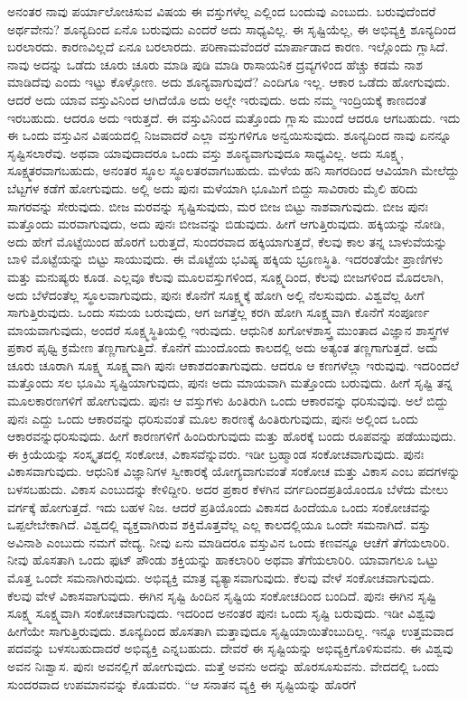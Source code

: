 ಅನಂತರ ನಾವು ಪರ್ಯಾಲೋಚಿಸುವ ವಿಷಯ ಈ ವಸ್ತುಗಳೆಲ್ಲ ಎಲ್ಲಿಂದ ಬಂದುವು ಎಂಬುದು. ಬರುವುದೆಂದರೆ ಅರ್ಥವೇನು? ಶೂನ್ಯದಿಂದ ಏನೊ ಬರುವುದು ಎಂದರೆ ಅದು ಸಾಧ್ಯವಿಲ್ಲ. ಈ ಸೃಷ್ಟಿಯೆಲ್ಲ, ಈ ಅಭಿವ್ಯಕ್ತಿ ಶೂನ್ಯದಿಂದ ಬರಲಾರದು. ಕಾರಣವಿಲ್ಲದೆ ಏನೂ ಬರಲಾರದು. ಪರಿಣಾಮವೆಂದರೆ ಮಾರ್ಪಾಡಾದ ಕಾರಣ. ಇಲ್ಲೊಂದು ಗ್ಲಾಸಿದೆ. ನಾವು ಅದನ್ನು ಒಡೆದು ಚೂರು ಚೂರು ಮಾಡಿ ಪುಡಿ ಮಾಡಿ ರಾಸಾಯನಿಕ ದ್ರವ್ಯಗಳಿಂದ ಹೆಚ್ಚು ಕಡಮೆ ನಾಶ ಮಾಡಿದೆವು ಎಂದು ಇಟ್ಟು ಕೊಳ್ಳೋಣ. ಅದು ಶೂನ್ಯವಾಗುವುದೆ? ಎಂದಿಗೂ ಇಲ್ಲ. ಆಕಾರ ಒಡೆದು ಹೋಗುವುದು. ಆದರೆ ಅದು ಯಾವ ವಸ್ತುವಿನಿಂದ ಆಗಿದೆಯೊ ಅದು ಅಲ್ಲೇ ಇರುವುದು. ಅದು ನಮ್ಮ ಇಂದ್ರಿಯಕ್ಕೆ ಕಾಣದಂತೆ ಇರಬಹುದು. ಆದರೂ ಅದು ಇರುತ್ತದೆ. ಈ ವಸ್ತುವಿನಿಂದ ಮತ್ತೊಂದು ಗ್ಲಾಸು ಮುಂದೆ ಆದರೂ ಆಗಬಹುದು. ಇದು ಈ ಒಂದು ವಸ್ತುವಿನ ವಿಷಯದಲ್ಲಿ ನಿಜವಾದರೆ ಎಲ್ಲಾ ವಸ್ತುಗಳಿಗೂ ಅನ್ವಯಿಸುವುದು. ಶೂನ್ಯದಿಂದ ನಾವು ಏನನ್ನೂ ಸೃಷ್ಟಿಸಲಾರೆವು. ಅಥವಾ ಯಾವುದಾದರೂ ಒಂದು ವಸ್ತು ಶೂನ್ಯವಾಗುವುದೂ ಸಾಧ್ಯವಿಲ್ಲ. ಅದು ಸೂಕ್ಷ್ಮ, ಸೂಕ್ಷ್ಮತರವಾಗಬಹುದು, ಅನಂತರ ಸ್ಥೂಲ ಸ್ಥೂಲತರವಾಗಬಹುದು. ಮಳೆಯ ಹನಿ ಸಾಗರದಿಂದ ಆವಿಯಾಗಿ ಮೇಲೆದ್ದು ಬೆಟ್ಟಗಳ ಕಡೆಗೆ ಹೋಗುವುದು. ಅಲ್ಲಿ ಅದು ಪುನಃ ಮಳೆಯಾಗಿ ಭೂಮಿಗೆ ಬಿದ್ದು ಸಾವಿರಾರು ಮೈಲಿ ಹರಿದು ಸಾಗರವನ್ನು ಸೇರುವುದು. ಬೀಜ ಮರವನ್ನು ಸೃಷ್ಟಿಸುವುದು, ಮರ ಬೀಜ ಬಿಟ್ಟು ನಾಶವಾಗುವುದು. ಬೀಜ ಪುನಃ ಮತ್ತೊಂದು ಮರವಾಗುವುದು, ಅದು ಪುನಃ ಬೀಜವನ್ನು ಬಿಡುವುದು. ಹೀಗೆ ಆಗುತ್ತಿರುವುದು. ಹಕ್ಕಿಯನ್ನು ನೋಡಿ, ಅದು ಹೇಗೆ ಮೊಟ್ಟೆಯಿಂದ ಹೊರಗೆ ಬರುತ್ತದೆ, ಸುಂದರವಾದ ಹಕ್ಕಿಯಾಗುತ್ತದೆ, ಕೆಲವು ಕಾಲ ತನ್ನ ಬಾಳುವೆಯನ್ನು ಬಾಳಿ ಮೊಟ್ಟೆಯನ್ನು ಬಿಟ್ಟು ಸಾಯುವುದು. ಈ ಮೊಟ್ಟೆಯ ಭವಿಷ್ಯ ಹಕ್ಕಿಯ ಭ್ರೂಣಸ್ಥಿತಿ. ಇದರಂತೆಯೇ ಪ್ರಾಣಿಗಳು ಮತ್ತು ಮನುಷ್ಯರು ಕೂಡ. ಎಲ್ಲವೂ ಕೆಲವು ಮೂಲವಸ್ತುಗಳಿಂದ, ಸೂಕ್ಷ್ಮದಿಂದ, ಕೆಲವು ಬೀಜಗಳಿಂದ ಮೊದಲಾಗಿ, ಅದು ಬೆಳೆದಂತೆಲ್ಲ ಸ್ಥೂಲವಾಗುವುದು, ಪುನಃ ಕೊನೆಗೆ ಸೂಕ್ಷ್ಮಕ್ಕೆ ಹೋಗಿ ಅಲ್ಲಿ ನೆಲಸುವುದು. ವಿಶ್ವವೆಲ್ಲ ಹೀಗೆ ಸಾಗುತ್ತಿರುವುದು. ಒಂದು ಸಮಯ ಬರುವುದು, ಆಗ ಜಗತ್ತೆಲ್ಲ ಕರಗಿ ಹೋಗಿ ಸೂಕ್ಷ್ಮವಾಗಿ ಕೊನೆಗೆ ಸಂಪೂರ್ಣ ಮಾಯವಾಗುವುದು, ಅಂದರೆ ಸೂಕ್ಷ್ಮಸ್ಥಿತಿಯಲ್ಲಿ ಇರುವುದು. ಆಧುನಿಕ ಖಗೋಳಶಾಸ್ತ್ರ ಮುಂತಾದ ವಿಜ್ಞಾನ ಶಾಸ್ತ್ರಗಳ ಪ್ರಕಾರ ಪೃಥ್ವಿ ಕ್ರಮೇಣ ತಣ್ಣಗಾಗುತ್ತಿದೆ. ಕೊನೆಗೆ ಮುಂದೊಂದು ಕಾಲದಲ್ಲಿ ಅದು ಅತ್ಯಂತ ತಣ್ಣಗಾಗುತ್ತದೆ. ಅದು ಚೂರು ಚೂರಾಗಿ ಸೂಕ್ಷ್ಮ ಸೂಕ್ಷ್ಮವಾಗಿ ಪುನಃ ಆಕಾಶದಂತಾಗುವುದು. ಆದರೂ ಆ ಕಣಗಳೆಲ್ಲಾ ಇರುವುವು. ಇದರಿಂದಲೆ ಮತ್ತೊಂದು ಸಲ ಭೂಮಿ ಸೃಷ್ಟಿಯಾಗುವುದು, ಪುನಃ ಅದು ಮಾಯವಾಗಿ ಮತ್ತೊಂದು ಬರುವುದು. ಹೀಗೆ ಸೃಷ್ಟಿ ತನ್ನ ಮೂಲಕಾರಣಗಳಿಗೆ ಹೋಗುವುದು. ಪುನಃ ಆ ವಸ್ತುಗಳು ಹಿಂತಿರುಗಿ ಒಂದು ಆಕಾರವನ್ನು ಧರಿಸುವುವು. ಅಲೆ ಬಿದ್ದು ಪುನಃ ಎದ್ದು ಒಂದು ಆಕಾರವನ್ನು ಧರಿಸುವಂತೆ ಮೂಲ ಕಾರಣಕ್ಕೆ ಹಿಂತಿರುಗುವುದು, ಪುನಃ ಅಲ್ಲಿಂದ ಒಂದು ಆಕಾರವನ್ನು\break ಧರಿಸುವುದು. ಹೀಗೆ ಕಾರಣಗಳಿಗೆ ಹಿಂದಿರುಗುವುದು ಮತ್ತು ಹೊರಕ್ಕೆ ಬಂದು ರೂಪವನ್ನು ಪಡೆಯುವುದು. ಈ ಕ್ರಿಯೆಯನ್ನು ಸಂಸ್ಕೃತದಲ್ಲಿ ಸಂಕೋಚ, ವಿಕಾಸವೆನ್ನುವರು. ಇಡೀ ಬ್ರಹ್ಮಾಂಡ ಸಂಕೋಚವಾಗುವುದು. ಪುನಃ ವಿಕಾಸವಾಗುವುದು. ಆಧುನಿಕ ವಿಜ್ಞಾನಿಗಳ ಸ್ವೀಕಾರಕ್ಕೆ ಯೋಗ್ಯವಾಗುವಂತೆ ಸಂಕೋಚ ಮತ್ತು ವಿಕಾಸ ಎಂಬ ಪದಗಳನ್ನು ಬಳಸಬಹುದು. ವಿಕಾಸ ಎಂಬುದನ್ನು ಕೇಳಿದ್ದೀರಿ. ಅದರ ಪ್ರಕಾರ ಕೆಳಗಿನ ವರ್ಗದಿಂದ\break ಪ್ರತಿಯೊಂದೂ ಬೆಳೆದು ಮೇಲು ವರ್ಗಕ್ಕೆ ಹೋಗುತ್ತದೆ. ಇದು ಬಹಳ ನಿಜ. ಆದರೆ ಪ್ರತಿಯೊಂದು ವಿಕಾಸದ ಹಿಂದೆಯೂ ಒಂದು ಸಂಕೋಚವನ್ನು ಒಪ್ಪಲೇಬೇಕಾಗಿದೆ. ವಿಶ್ವದಲ್ಲಿ ವ್ಯಕ್ತವಾಗಿರುವ ಶಕ್ತಿಮೊತ್ತವೆಲ್ಲ ಎಲ್ಲ ಕಾಲದಲ್ಲಿಯೂ ಒಂದೇ ಸಮನಾಗಿದೆ. ವಸ್ತು ಅವಿನಾಶಿ ಎಂಬುದು ನಮಗೆ ವೇದ್ಯ. ನೀವು ಏನು ಮಾಡಿದರೂ ವಸ್ತುವಿನ ಒಂದು ಕಣವನ್ನೂ ಆಚೆಗೆ ತೆಗೆಯಲಾರಿರಿ. ನೀವು ಹೊಸತಾಗಿ ಒಂದು ಫುಟ್ ಪೌಂಡು ಶಕ್ತಿಯನ್ನು ಹಾಕಲಾರಿರಿ ಅಥವಾ ತೆಗೆಯಲಾರಿರಿ. ಯಾವಾಗಲೂ ಒಟ್ಟು ಮೊತ್ತ ಒಂದೇ ಸಮನಾಗಿರುವುದು. ಅಭಿವ್ಯಕ್ತಿ ಮಾತ್ರ ವ್ಯತ್ಯಾಸವಾಗುವುದು. ಕೆಲವು ವೇಳೆ ಸಂಕೋಚವಾಗುವುದು. ಕೆಲವು ವೇಳೆ ವಿಕಾಸವಾಗುವುದು. ಈಗಿನ ಸೃಷ್ಟಿ ಹಿಂದಿನ ಸೃಷ್ಟಿಯ ಸಂಕೋಚದಿಂದ ಬಂದಿದೆ. ಪುನಃ ಈಗಿನ ಸೃಷ್ಟಿ ಸೂಕ್ಷ್ಮ ಸೂಕ್ಷ್ಮವಾಗಿ ಸಂಕೋಚವಾಗುವುದು. ಇದರಿಂದ ಅನಂತರ ಪುನಃ ಒಂದು ಸೃಷ್ಟಿ ಬರುವುದು. ಇಡೀ ವಿಶ್ವವು ಹೀಗೆಯೇ ಸಾಗುತ್ತಿರುವುದು. ಶೂನ್ಯದಿಂದ ಹೊಸತಾಗಿ ಮತ್ತಾವುದೂ ಸೃಷ್ಟಿಯಾಯಿತೆಂಬುದಿಲ್ಲ. ಇನ್ನೂ ಉತ್ತಮವಾದ ಪದವನ್ನು ಬಳಸಬಹುದಾದರೆ ಅಭಿವ್ಯಕ್ತಿ ಎನ್ನಬಹುದು. ದೇವರೆ ಈ ಸೃಷ್ಟಿಯನ್ನು ಅಭಿವ್ಯಕ್ತಿಗೊಳಿಸುವನು. ಈ ವಿಶ್ವವು ಅವನ ನಿಃಶ್ವಾಸ. ಪುನಃ ಅವನಲ್ಲಿಗೆ ಹೋಗುವುದು. ಮತ್ತೆ ಅವನು ಅದನ್ನು ಹೊರಸೂಸುವನು. ವೇದದಲ್ಲಿ ಒಂದು ಸುಂದರವಾದ ಉಪಮಾನವನ್ನು ಕೊಡುವರು. ``ಆ ಸನಾತನ ವ್ಯಕ್ತಿ ಈ ಸೃಷ್ಟಿಯನ್ನು ಹೊರಗೆ 